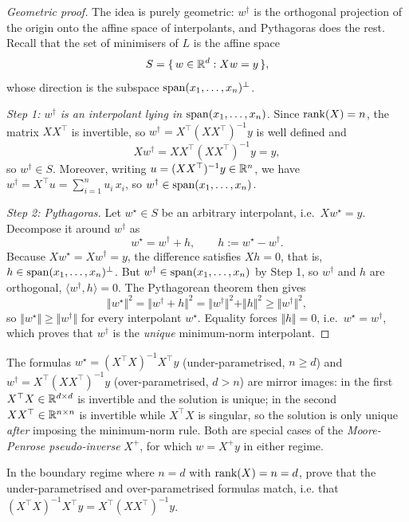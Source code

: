 \begin{proof}[Geometric proof]
The idea is purely geometric: $w^\dagger$ is the orthogonal projection of the
origin onto the affine space of interpolants, and Pythagoras does the rest. Recall
that the set of minimisers of $L$ is the affine space
\[
S = \{\, w \in \mathbb{R}^d : Xw = y \,\} ,
\]
whose direction is the subspace $\operatorname{span}(x_1, \dots, x_n)^\perp$.

\emph{Step 1: $w^\dagger$ is an interpolant lying in $\operatorname{span}(x_1, \dots, x_n)$.}
Since $\operatorname{rank}(X) = n$, the matrix $XX^\top$ is invertible, so $w^\dagger = X^\top
(XX^\top)^{-1} y$ is well defined and
\[
X w^\dagger = XX^\top (XX^\top)^{-1} y = y ,
\]
so $w^\dagger \in S$. Moreover, writing $u = (XX^\top)^{-1} y \in \mathbb{R}^n$, we have
$w^\dagger = X^\top u = \sum_{i=1}^n u_i\, x_i$, so $w^\dagger \in \operatorname{span}(x_1, \dots,
x_n)$.

\emph{Step 2: Pythagoras.}
Let $w^\star \in S$ be an arbitrary interpolant, i.e.\
$X w^\star = y$. Decompose it around $w^\dagger$ as
\[
w^\star = w^\dagger + h, \qquad h := w^\star - w^\dagger .
\]
Because $X w^\star = X w^\dagger = y$, the difference satisfies $X h = 0$, that is,
$h \in \operatorname{span}(x_1, \dots, x_n)^\perp$. But $w^\dagger \in \operatorname{span}(x_1, \dots, x_n)$ by Step 1, so $w^\dagger$ and $h$
are orthogonal, $\langle w^\dagger, h \rangle = 0$. The Pythagorean theorem then
gives
\[
\Vert w^\star \Vert^2 = \Vert w^\dagger + h \Vert^2
= \Vert w^\dagger \Vert^2 + \Vert h \Vert^2 \geq \Vert w^\dagger \Vert^2 ,
\]
so $\Vert w^\star \Vert \geq \Vert w^\dagger \Vert$ for every interpolant $w^\star$.
Equality forces $\Vert h \Vert = 0$, i.e.\ $w^\star = w^\dagger$, which proves that
$w^\dagger$ is the \emph{unique} minimum-norm interpolant.
\end{proof}



\begin{remark}
The formulas $w^\star = (X^\top X)^{-1} X^\top y$ (under-parametrised, $n \geq d$)
and $w^\dagger = X^\top (XX^\top)^{-1} y$ (over-parametrised, $d > n$) are mirror
images: in the first $X^\top X \in \mathbb{R}^{d \times d}$ is invertible and the solution
is unique; in the second $XX^\top \in \mathbb{R}^{n \times n}$ is invertible while $X^\top
X$ is singular, so the solution is only unique \emph{after} imposing the
minimum-norm rule. Both are special cases of the \emph{Moore-Penrose
pseudo-inverse} $X^+$, for which $w = X^+ y$ in either regime.
\end{remark}

\begin{exercise}[$\star$]
In the boundary regime where $n = d$ with $\operatorname{rank}(X) = n = d$, prove that the under-parametrised and over-parametrised formulas match, i.e. that
$(X^\top X)^{-1} X^\top y = X^\top (X X^\top)^{-1}y$.
\end{exercise}

